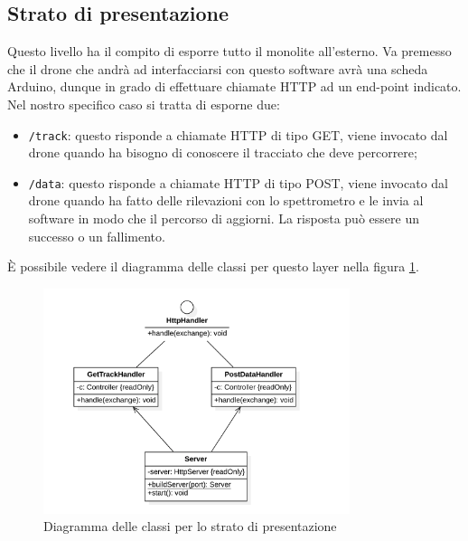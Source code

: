 \subsection{Strato di presentazione}
Questo livello ha il compito di esporre tutto il monolite all'esterno.
Va premesso che il drone che andrà ad interfacciarsi con questo software avrà una scheda Arduino, dunque in grado di effettuare chiamate HTTP ad un end-point indicato.
Nel nostro specifico caso si tratta di esporne due:
\begin{itemize}
    \item \verb|/track|: questo risponde a chiamate HTTP di tipo GET, viene invocato dal drone quando ha bisogno di conoscere il tracciato che deve percorrere;
    \item \verb|/data|: questo risponde a chiamate HTTP di tipo POST, viene invocato dal drone quando ha fatto delle rilevazioni con lo spettrometro e le invia al software in modo che il percorso di aggiorni. La risposta può essere un successo o un fallimento.
\end{itemize}
È possibile vedere il diagramma delle classi per questo layer nella figura \ref{fig:class_diagram_presentation}.

\begin{figure}
    \centering
    \includegraphics[width=0.8\textwidth]{immagini/presentation_classes.png}
    \caption{Diagramma delle classi per lo strato di presentazione}
    \label{fig:class_diagram_presentation}
\end{figure}